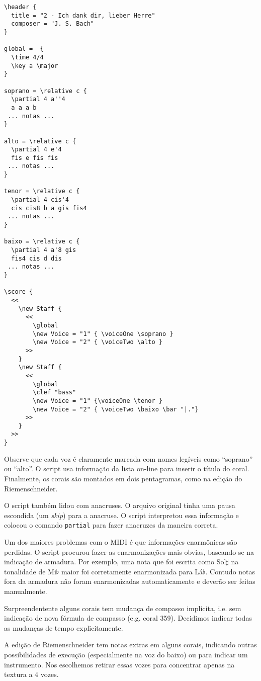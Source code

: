 \documentclass[12pt,brazil]{book}
\begin{document}
\begin{verbatim}
\header {
  title = "2 - Ich dank dir, lieber Herre"
  composer = "J. S. Bach"
}

global =  {
  \time 4/4 
  \key a \major
}

soprano = \relative c {
  \partial 4 a''4 
  a a a b 
 ... notas ...
}

alto = \relative c {
  \partial 4 e'4 
  fis e fis fis 
 ... notas ...
}

tenor = \relative c {
  \partial 4 cis'4 
  cis cis8 b a gis fis4 
 ... notas ...
}

baixo = \relative c {
  \partial 4 a'8 gis 
  fis4 cis d dis 
 ... notas ...
}

\score {
  <<
    \new Staff {
      <<
        \global
        \new Voice = "1" { \voiceOne \soprano }
        \new Voice = "2" { \voiceTwo \alto }
      >>
    }
    \new Staff {
      <<
        \global
        \clef "bass"
        \new Voice = "1" {\voiceOne \tenor }
        \new Voice = "2" { \voiceTwo \baixo \bar "|."}
      >>
    }
  >>
}
\end{verbatim}

Observe que cada voz é claramente marcada com nomes legíveis como
``soprano'' ou ``alto''. O script usa informação da lista on-line para
inserir o título do coral. Finalmente, os corais são montados em dois
pentagramas, como na edição do Riemenschneider.

O script também lidou com anacruses. O arquivo original tinha uma
pausa escondida (um \textit{skip}) para a anacruse. O script
interpretou essa informação e colocou o comando \texttt{partial} para
fazer anacruzes da maneira correta.

Um dos maiores problemas com o MIDI é que informações enarmônicas são
perdidas. O script procurou fazer as enarmonizações mais obvias,
baseando-se na indicação de armadura. Por exemplo, uma nota que foi
escrita como Sol$\sharp$ na tonalidade de Mi$\flat$ maior foi
corretamente enarmonizada para Lá$\flat$. Contudo notas fora da
armadura não foram enarmonizadas automaticamente e deverão ser feitas
manualmente.

Surpreendentente alguns corais tem mudança de compasso implícita, i.e.
sem indicação de nova fórmula de compasso (e.g. coral 359). Decidimos
indicar todas as mudanças de tempo explicitamente.

A edição de Riemenschneider tem notas extras em alguns corais,
indicando outras possibilidades de execução (especialmente na voz do
baixo) ou para indicar um instrumento. Nos escolhemos retirar essas
vozes para concentrar apenas na textura a 4 vozes.
\end{document}
